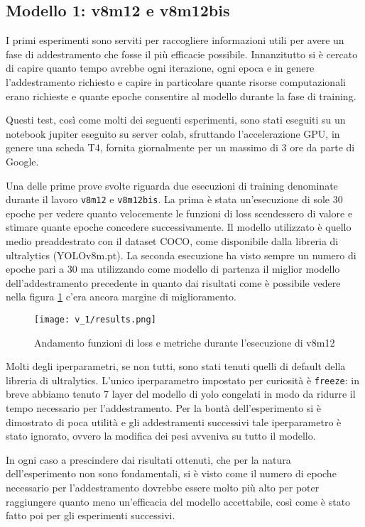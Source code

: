 \subsection*{Modello 1: v8m12 e v8m12bis}

I primi esperimenti sono serviti per raccogliere informazioni utili per avere un fase di 
addestramento che fosse il più efficacie possibile. Innanzitutto si è cercato di capire quanto
tempo avrebbe ogni iterazione, ogni epoca e in genere l'addestramento richiesto e capire 
in particolare quante risorse computazionali erano richieste e quante epoche consentire
al modello durante la fase di training.

Questi test, così come molti dei seguenti esperimenti, sono stati eseguiti su un notebook
jupiter eseguito su server colab, sfruttando l'accelerazione GPU, in genere una scheda T4, 
fornita giornalmente per un massimo di 3 ore da parte di Google.


Una delle prime prove svolte riguarda due esecuzioni di training denominate durante il lavoro
\verb+v8m12+ e \verb+v8m12bis+. La prima è stata un'esecuzione di sole 30 epoche per vedere quanto 
velocemente le funzioni di loss scendessero di valore e stimare quante epoche concedere successivamente.
Il modello utilizzato è quello medio preaddestrato con il dataset COCO, come disponibile dalla libreria 
di ultralytics (YOLOv8m.pt).
La seconda esecuzione ha visto sempre un numero di epoche pari a 30 ma utilizzando come modello di
partenza il miglior modello dell'addestramento precedente in quanto dai risultati come è possibile vedere 
nella figura \ref{fig:v1-1} c'era ancora margine di miglioramento.

\begin{figure}[h]
    \centering
    \texttt{[image: v\_1/results.png]}
    \caption{Andamento funzioni di loss e metriche durante l'esecuzione di v8m12}
    \label{fig:v1-1}
    \end{figure}

Molti degli iperparametri, se non tutti, sono stati tenuti quelli di default della libreria di ultralytics.
L'unico iperparametro impostato per curiosità è \verb|freeze|: in breve abbiamo tenuto 7 layer del modello 
di yolo congelati in modo da ridurre il tempo necessario per l'addestramento. Per la bontà dell'esperimento
si è dimostrato di poca utilità e gli addestramenti successivi tale iperparametro è stato ignorato, 
ovvero la modifica dei pesi avveniva su tutto il modello.



In ogni caso a prescindere dai risultati ottenuti, che per la natura dell'esperimento non sono
fondamentali, si è visto come il numero di epoche necessario per 
l'addestramento dovrebbe essere molto più alto per poter raggiungere quanto meno un'efficacia del modello
accettabile, così come è stato fatto poi per gli esperimenti successivi.